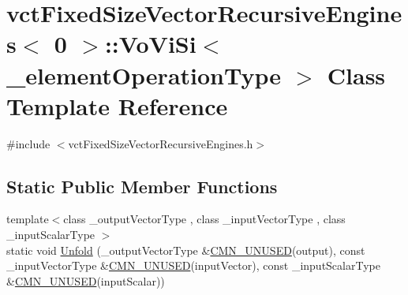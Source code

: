 \hypertarget{classvct_fixed_size_vector_recursive_engines_3_010_01_4_1_1_vo_vi_si}{\section{vct\-Fixed\-Size\-Vector\-Recursive\-Engines$<$ 0 $>$\-:\-:Vo\-Vi\-Si$<$ \-\_\-element\-Operation\-Type $>$ Class Template Reference}
\label{classvct_fixed_size_vector_recursive_engines_3_010_01_4_1_1_vo_vi_si}
}


{\ttfamily \#include $<$vct\-Fixed\-Size\-Vector\-Recursive\-Engines.\-h$>$}

\subsection*{Static Public Member Functions}
\begin{DoxyCompactItemize}
\item 
{\footnotesize template$<$class \-\_\-output\-Vector\-Type , class \-\_\-input\-Vector\-Type , class \-\_\-input\-Scalar\-Type $>$ }\\static void \hyperlink{classvct_fixed_size_vector_recursive_engines_3_010_01_4_1_1_vo_vi_si_a67c80d760b93058f9ce0f6b40ce15b80}{Unfold} (\-\_\-output\-Vector\-Type \&\hyperlink{cmn_portability_8h_a021894e2626935fa2305434b1e893ff6}{C\-M\-N\-\_\-\-U\-N\-U\-S\-E\-D}(output), const \-\_\-input\-Vector\-Type \&\hyperlink{cmn_portability_8h_a021894e2626935fa2305434b1e893ff6}{C\-M\-N\-\_\-\-U\-N\-U\-S\-E\-D}(input\-Vector), const \-\_\-input\-Scalar\-Type \&\hyperlink{cmn_portability_8h_a021894e2626935fa2305434b1e893ff6}{C\-M\-N\-\_\-\-U\-N\-U\-S\-E\-D}(input\-Scalar))
\end{DoxyCompactItemize}


